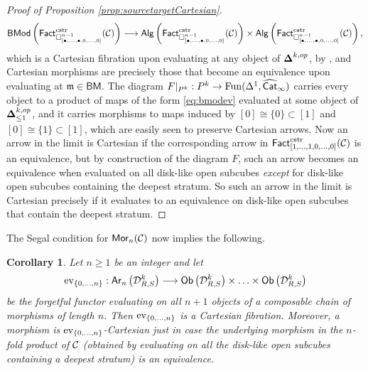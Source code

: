 \documentclass[10pt, reqno, twoside
, final
]{amsart}
\numberwithin{equation}{subsection}%
\theoremstyle{definition}
\theoremstyle{definition}
\theoremstyle{definition}
\theoremstyle{definition}
\theoremstyle{definition}
\theoremstyle{definition}
\theoremstyle{definition}
\theoremstyle{definition}
\theoremstyle{definition}
\theoremstyle{plain}
\theoremstyle{definition}
\theoremstyle{plain}
\theoremstyle{definition}
\theoremstyle{plain}
\newtheorem{cor}[defn]{Corollary}
\theoremstyle{definition}
\theoremstyle{definition}
\theoremstyle{plain}
\theoremstyle{plain}
\theoremstyle{definition}
\theoremstyle{plain}
\theoremstyle{plain}
\theoremstyle{plain}
\begin{document}
\begin{proof}[Proof of Proposition \ref{prop:sourcetargetCartesian}]
\begin{equation}\label{eq:bmodev}
\mathsf{BMod}\left(\mathsf{Fact}^{\mathrm{cstr}}_{\square^{n-1}_{[\bullet,\ldots,\bullet,0,\ldots,0]}}(\mathcal{C})\right)
\longrightarrow \mathsf{Alg}\left(\mathsf{Fact}^{\mathrm{cstr}}_{\square^{n-1}_{[\bullet,\ldots,\bullet,0,\ldots,0]}}(\mathcal{C})\right)\times \mathsf{Alg}\left(\mathsf{Fact}^{\mathrm{cstr}}_{\square^{n-1}_{[\bullet,\ldots,\bullet,0,\ldots,0]}}(\mathcal{C})\right),
\end{equation}
which is a Cartesian fibration upon evaluating at any object of $\boldsymbol{\Delta}^{k,op}$, by \cite[Corollary 4.3.3.3]{LurHA}, and Cartesian morphisms are precisely those that become an equivalence upon evaluating at $\mathfrak{m}\in \mathsf{BM}$. The diagram $F|_{P^k}:P^k\rightarrow \mathrm{Fun}(\Delta^1,\widehat{\mathsf{Cat}}_{\infty})$ carries every object to a product of maps of the form \eqref{eq:bmodev} evaluated at some object of $\boldsymbol{\Delta}^{k,op}_{\leq 1}$, and it carries morphisms to maps induced by $[0]\cong \{0\}\subset [1]$ and $[0]\cong \{1\}\subset [1]$, which are easily seen to preserve Cartesian arrows. Now an arrow in the limit is Cartesian if the corresponding arrow in $\mathsf{Fact}^{\mathrm{cstr}}_{[1,\ldots,1,0,\ldots,0]}(\mathcal{C})$ is an equivalence, but by construction of the diagram $F$, such an arrow becomes an equivalence when evaluated on all disk-like open subcubes \emph{except} for disk-like open subcubes containing the deepest stratum. So such an arrow in the limit is Cartesian precisely if it evaluates to an equivalence on disk-like open subcubes that contain the deepest stratum.
\end{proof}

The Segal condition for $\mathsf{Mor}_n(\mathcal{C})$ now implies the following.

\begin{cor}\label{cor:cartfib}
Let $n\geq 1$ be an integer and let
\[\mathrm{ev}_{\{0,\ldots,n\}}:
\mathsf{Ar}_n\left(\mathcal{D}_{R,S}^k\right)\longrightarrow \mathsf{Ob}\left(\mathcal{D}_{R,S}^k\right)\times\ldots\times \mathsf{Ob}\left(\mathcal{D}_{R,S}^k\right) 
\]
be the forgetful functor evaluating on all $n+1$ objects of a composable chain of morphisms of length $n$. Then $\mathrm{ev}_{\{0,\ldots,n\}}$ is a Cartesian fibration. Moreover, a morphism is $\mathrm{ev}_{\{0,\ldots,n\}}$-Cartesian just in case the underlying morphism in the $n$-fold product of $\mathcal{C}$ (obtained by evaluating on all the disk-like open subcubes containing a deepest stratum) is an equivalence.
\end{cor}
\end{document}
